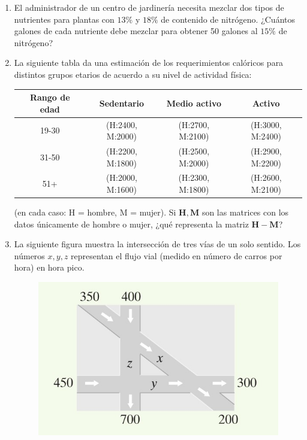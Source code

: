 \documentclass[8pt,a4paper]{article}
\begin{document}
\begin{enumerate}
	\item El administrador de un centro de jardinería necesita mezclar dos tipos de nutrientes para plantas con $13\%$ y $18\%$ de contenido de nitrógeno. ¿Cuántos galones de cada nutriente debe mezclar para obtener 50 galones al $15\%$ de nitrógeno?

	\item La siguiente tabla da una estimación de los requerimientos calóricos para distintos grupos etarios de acuerdo a su nivel de actividad física:
	
	\begin{center}
		\begin{tabular}{c|c|c|c}
			Rango de edad & Sedentario & Medio activo & Activo \\
			\hline
			19-30 & (H:2400, M:2000) & (H:2700, M:2100) & (H:3000, M:2400) \\
			31-50 & (H:2200, M:1800) & (H:2500, M:2000) & (H:2900, M:2200) \\
			51+	 & (H:2000, M:1600) & (H:2300, M:1800) & (H:2600, M:2100)
		\end{tabular}
	\end{center}
(en cada caso: H = hombre, M = mujer). Si $\mathbf{H}, \mathbf{M}$ son las matrices con los datos únicamente de hombre o mujer, ¿qué representa la matriz $\mathbf{H}-\mathbf{M}$?
	
	\item La siguiente figura muestra la intersección de tres vías de un solo sentido. Los números $x,y,z$ representan el flujo vial (medido en número de carros por hora) en hora pico.
	
		\begin{figure}[!h]
		\centering
		\includegraphics[scale=0.4]{trafico.jpg}
		\end{figure}


\end{enumerate}
\end{document}
